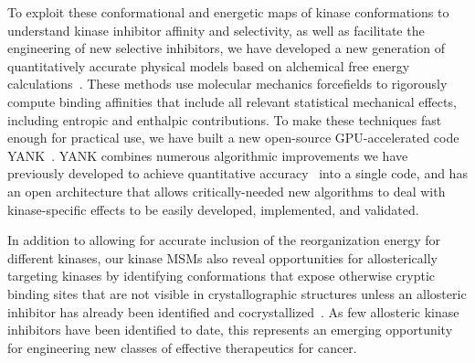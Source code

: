 \documentclass[10pt]{article}
\begin{document}
To exploit these conformational and energetic maps of kinase conformations to understand kinase inhibitor affinity and selectivity, as well as facilitate the engineering of new selective inhibitors, we have developed a new generation of quantitatively accurate physical models based on alchemical free energy calculations~\cite{chodera:curr-opin-struct-biol:2011:drug-discovery}.
These methods use molecular mechanics forcefields to rigorously compute binding affinities that include all relevant statistical mechanical effects, including entropic and enthalpic contributions.
To make these techniques fast enough for practical use, we have built a new open-source GPU-accelerated code {\sc YANK}~\cite{wang:jcamd:2013:yank}.
{\sc YANK} combines numerous algorithmic improvements we have previously developed to achieve quantitative accuracy~\cite{mobley-chodera-dill:2006:jcp:orientation-restraints,mobley-chodera-dill:2007:jctc:confine-and-release,shirts-mobley-chodera-pande:2007:jpcb:dispersion-corrections,chodera:jcp:2007,shirts-chodera:jcp:2008:mbar,noe:jcp:2011:msm-review,ncmc,chodera-shirts:jcp:2011:gibbs} into a single code, and has an open architecture that allows critically-needed new algorithms to deal with kinase-specific effects to be easily developed, implemented, and validated.

In addition to allowing for accurate inclusion of the reorganization energy for different kinases, our kinase MSMs also reveal opportunities for allosterically targeting kinases by identifying conformations that expose otherwise cryptic binding sites that are not visible in crystallographic structures unless an allosteric inhibitor has already been identified and cocrystallized~\cite{bowman-geissler:pnas:2012:cryptic-allosteric-sites}.
As few allosteric kinase inhibitors have been identified to date, this represents an emerging opportunity for engineering new classes of effective therapeutics for cancer.
\end{document}
